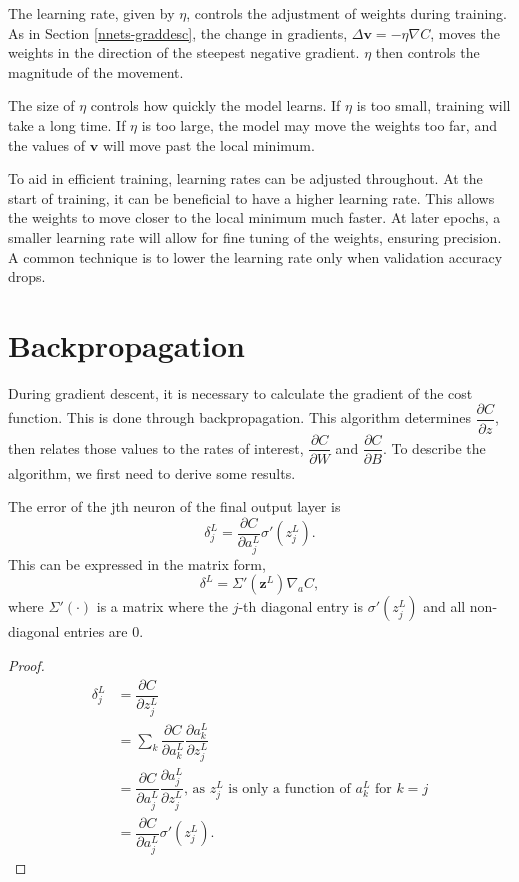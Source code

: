 The learning rate, given by $\eta$, controls the adjustment of weights during training. As in Section \ref{nnets-graddesc}, the change in gradients, $\Delta\mathbf{v} = -\eta\nabla C$, moves the weights in the direction of the steepest negative gradient. $\eta$ then controls the magnitude of the movement.

The size of $\eta$ controls how quickly the model learns. If $\eta$ is too small, training will take a long time. If $\eta$ is too large, the model may move the weights too far, and the values of $\mathbf{v}$ will move past the local minimum.

To aid in efficient training, learning rates can be adjusted throughout. At the start of training, it can be beneficial to have a higher learning rate. This allows the weights to move closer to the local minimum much faster. At later epochs, a smaller learning rate will allow for fine tuning of the weights, ensuring precision. A common technique is to lower the learning rate only when validation accuracy drops.

\section{Backpropagation}\label{nnets-backprop}

During gradient descent, it is necessary to calculate the gradient of the cost function. This is done through backpropagation. This algorithm determines $\dfrac{\partial C}{\partial z}$, then relates those values to the rates of interest, $\dfrac{\partial C}{\partial W}$ and $\dfrac{\partial C}{\partial B}$. To describe the algorithm, we first need to derive some results.


\begin{proposition}
	The error of the jth neuron of the final output layer is
	\[
		\delta_j^L = \dfrac{\partial C}{\partial a_j^L}\sigma'(z_j^L).
	\]
	This can be expressed in the matrix form,
	\[
		\delta^L = \Sigma'(\mathbf{z}^L)\nabla_aC,
	\]
where $\Sigma'(\cdot)$ is a matrix where the $j$-th diagonal entry is $\sigma'(z_j^L)$ and all non-diagonal entries are 0.
\end{proposition}

\begin{proof}
	\begin{align*}
		\delta_j^L & = \dfrac{\partial C}{\partial z_j^L} \\
		& = \sum_k\dfrac{\partial C}{\partial a_k^L}\dfrac{\partial a_k^L}{\partial z_j^L} \\
		& = \dfrac{\partial C}{\partial a_j^L}\dfrac{\partial a_j^L}{\partial z_j^L}\text{, as }z_j^L\text{ is only a function of }a_k^L\text{ for }k = j \\
		& = \dfrac{\partial C}{\partial a_j^L}\sigma'(z_j^L).
	\end{align*}
\end{proof}

